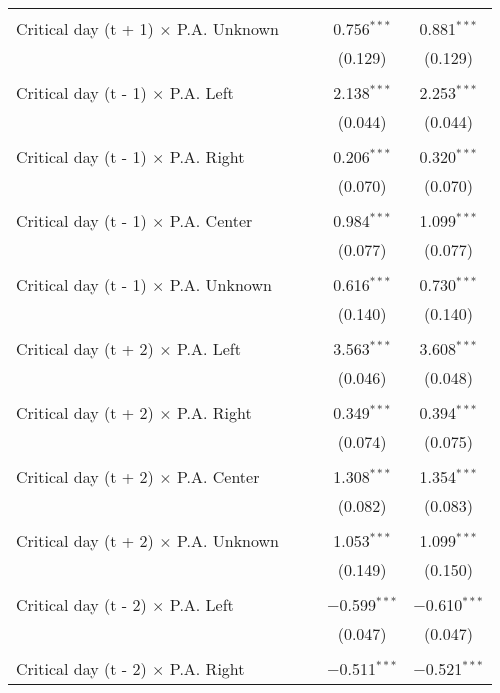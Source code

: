 \documentclass[
]{article}
\begin{document}
\begin{table}[!htbp]
{\begin{tabular}{@{\extracolsep{5pt}}lcccc}
  & & & & \\ 
 Critical day (t + 1) $\times$ P.A. Unknown &  &  & 0.756$^{***}$ & 0.881$^{***}$ \\ 
  &  &  & (0.129) & (0.129) \\ 
  & & & & \\ 
 Critical day (t - 1) $\times$ P.A. Left &  &  & 2.138$^{***}$ & 2.253$^{***}$ \\ 
  &  &  & (0.044) & (0.044) \\ 
  & & & & \\ 
 Critical day (t - 1) $\times$ P.A. Right &  &  & 0.206$^{***}$ & 0.320$^{***}$ \\ 
  &  &  & (0.070) & (0.070) \\ 
  & & & & \\ 
 Critical day (t - 1) $\times$ P.A. Center &  &  & 0.984$^{***}$ & 1.099$^{***}$ \\ 
  &  &  & (0.077) & (0.077) \\ 
  & & & & \\ 
 Critical day (t - 1) $\times$ P.A. Unknown &  &  & 0.616$^{***}$ & 0.730$^{***}$ \\ 
  &  &  & (0.140) & (0.140) \\ 
  & & & & \\ 
 Critical day (t + 2) $\times$ P.A. Left &  &  & 3.563$^{***}$ & 3.608$^{***}$ \\ 
  &  &  & (0.046) & (0.048) \\ 
  & & & & \\ 
 Critical day (t + 2) $\times$ P.A. Right &  &  & 0.349$^{***}$ & 0.394$^{***}$ \\ 
  &  &  & (0.074) & (0.075) \\ 
  & & & & \\ 
 Critical day (t + 2) $\times$ P.A. Center &  &  & 1.308$^{***}$ & 1.354$^{***}$ \\ 
  &  &  & (0.082) & (0.083) \\ 
  & & & & \\ 
 Critical day (t + 2) $\times$ P.A. Unknown &  &  & 1.053$^{***}$ & 1.099$^{***}$ \\ 
  &  &  & (0.149) & (0.150) \\ 
  & & & & \\ 
 Critical day (t - 2) $\times$ P.A. Left &  &  & $-$0.599$^{***}$ & $-$0.610$^{***}$ \\ 
  &  &  & (0.047) & (0.047) \\ 
  & & & & \\ 
 Critical day (t - 2) $\times$ P.A. Right &  &  & $-$0.511$^{***}$ & $-$0.521$^{***}$ \\ 

\end{tabular}}
\end{table}
\end{document}
